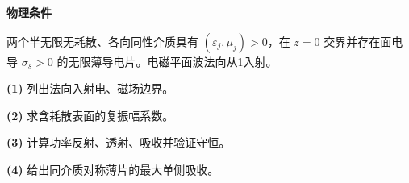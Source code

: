 \textbf{物理条件}\par 两个半无限无耗散、各向同性介质具有 \((\varepsilon_j,\mu_j)>0\)，在 \(z=0\) 交界并存在面电导 \(\sigma_s>0\) 的无限薄导电片。电磁平面波法向从1入射。
\par\noindent\textbf{(1)} 列出法向入射电、磁场边界。
\par\noindent\textbf{(2)} 求含耗散表面的复振幅系数。
\par\noindent\textbf{(3)} 计算功率反射、透射、吸收并验证守恒。
\par\noindent\textbf{(4)} 给出同介质对称薄片的最大单侧吸收。
